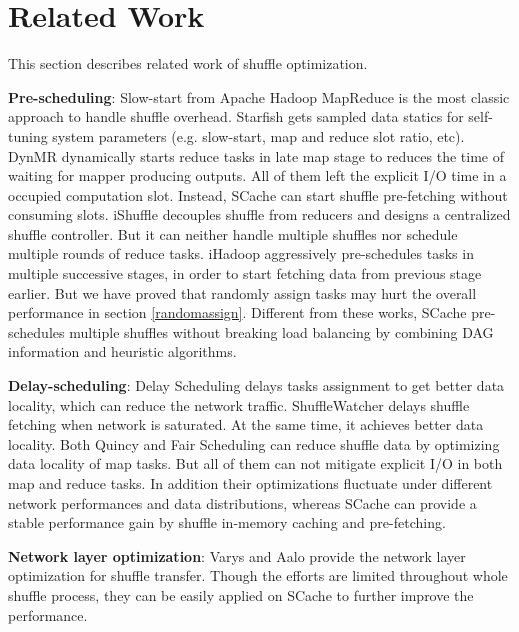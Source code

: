 \section{Related Work}
This section describes related work of shuffle optimization.

\textbf{Pre-scheduling}: Slow-start from Apache Hadoop MapReduce \cite{hadoop} is the most classic approach to handle shuffle overhead. Starfish \cite{starfish} gets sampled data statics for self-tuning system parameters (e.g. slow-start, map and reduce slot ratio, etc). DynMR \cite{dynmr} dynamically starts reduce tasks in late map stage to reduces the time of waiting for mapper producing outputs. All of them left the explicit I/O time in a occupied computation slot. Instead, SCache can start shuffle pre-fetching without consuming slots. iShuffle \cite{ishuffle} decouples shuffle from reducers and designs a centralized shuffle controller. But it can neither handle multiple shuffles nor schedule multiple rounds of reduce tasks. iHadoop \cite{ihadoop} aggressively pre-schedules tasks in multiple successive stages, in order to start fetching data from previous stage earlier. But we have proved that randomly assign tasks may hurt the overall performance in section \ref{randomassign}. Different from these works, SCache pre-schedules multiple shuffles without breaking load balancing by combining DAG information and heuristic algorithms.

\textbf{Delay-scheduling}: Delay Scheduling \cite{delay} delays tasks assignment to get better data locality, which can reduce the network traffic. ShuffleWatcher \cite{shufflewatcher} delays shuffle fetching when network is saturated. At the same time, it achieves better data locality. Both Quincy \cite{quincy} and Fair Scheduling \cite{preemptive} can reduce shuffle data by optimizing data locality of map tasks. But all of them can not mitigate explicit I/O in both map and reduce tasks. In addition their optimizations fluctuate under different network performances and data distributions, whereas SCache can provide a stable performance gain by shuffle in-memory caching and pre-fetching.

\textbf{Network layer optimization}: Varys \cite{varys} and Aalo \cite{aalo} provide the network layer optimization for shuffle transfer. Though the efforts are limited throughout whole shuffle process, they can be easily applied on SCache to further improve the performance.